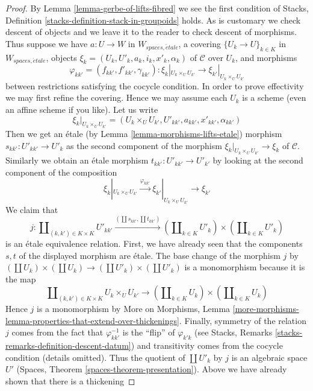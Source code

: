 \documentclass{stacks-project}
\theoremstyle{plain}
\theoremstyle{definition}
\theoremstyle{remark}
\numberwithin{equation}{subsection}
\def\etale{{\acute{e}tale}}
\begin{document}
\begin{proof}
By Lemma \ref{lemma-gerbe-of-lifts-fibred} we see the first condition
of Stacks, Definition \ref{stacks-definition-stack-in-groupoids} holds.
As is customary we check descent of objects and we leave it to the reader
to check descent of morphisms. Thus suppose we have $a : U \to W$
in $W_{spaces, \etale}$, a covering $\{U_k \to U\}_{k \in K}$ in
$W_{spaces, \etale}$, objects $\xi_k = (U_k, U'_k, a_k, i_k, x'_k, \alpha_k)$
of $\mathcal{C}$ over $U_k$, and morphisms
$$
\varphi_{kk'} = (f_{kk'}, f'_{kk'}, \gamma_{kk'}) :
\xi_k|_{U_k \times_U U_{k'}} \to
\xi_{k'}|_{U_k \times_U U_{k'}}
$$
between restrictions satisfying the cocycle condition. In order to prove
effectivity we may first refine the covering. Hence we may assume each
$U_k$ is a scheme (even an affine scheme if you like). Let us write
$$
\xi_k|_{U_k \times_U U_{k'}} =
(U_k \times_U U_{k'}, U'_{kk'}, a_{kk'}, x'_{kk'}, \alpha_{kk'})
$$
Then we get an \'etale (by Lemma \ref{lemma-morphisms-lifts-etale}) morphism
$s_{kk'} : U'_{kk'} \to U'_k$
as the second component of the morphism
$\xi_k|_{U_k \times_U U_{k'}} \to \xi_k$ of $\mathcal{C}$.
Similarly we obtain an \'etale morphism $t_{kk'} : U'_{kk'} \to U'_{k'}$
by looking at the second component of the composition
$$
\xi_k|_{U_k \times_U U_{k'}} \xrightarrow{\varphi_{kk'}}
\xi_{k'}|_{U_k \times_U U_{k'}} \to \xi_{k'}
$$
We claim that
$$
j :
\coprod\nolimits_{(k, k') \in K \times K} U'_{kk'}
\xrightarrow{(\coprod s_{kk'}, \coprod t_{kk'})}
(\coprod\nolimits_{k \in K} U'_k) \times (\coprod\nolimits_{k \in K} U'_k)
$$
is an \'etale equivalence relation. First, we have already seen
that the components $s, t$ of the displayed morphism are \'etale.
The base change of the morphism $j$ by
$(\coprod U_k) \times (\coprod U_k) \to (\coprod U'_k) \times (\coprod U'_k)$
is a monomorphism because it is the map
$$
\coprod\nolimits_{(k, k') \in K \times K} U_k \times_U U_{k'}
\longrightarrow
(\coprod\nolimits_{k \in K} U_k) \times (\coprod\nolimits_{k \in K} U_k)
$$
Hence $j$ is a monomorphism by More on Morphisms, Lemma
\ref{more-morphisms-lemma-properties-that-extend-over-thickenings}.
Finally, symmetry of the relation $j$ comes from the fact that
$\varphi_{kk'}^{-1}$ is the ``flip'' of $\varphi_{k'k}$ (see
Stacks, Remarks \ref{stacks-remarks-definition-descent-datum})
and transitivity comes from the cocycle condition (details omitted).
Thus the quotient of $\coprod U'_k$ by $j$ is an algebraic space $U'$
(Spaces, Theorem \ref{spaces-theorem-presentation}).
Above we have already shown that there is a thickening

\end{proof}
\end{document}
